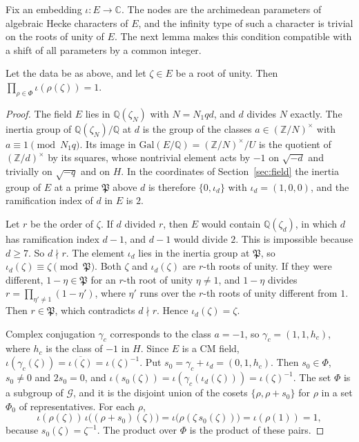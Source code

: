 Fix an embedding $\iota\colon E\to\mathbb C$. The nodes are the archimedean parameters of algebraic Hecke characters of $E$, and the infinity type of such a character is trivial on the roots of unity of $E$. The next lemma makes this condition compatible with a shift of all parameters by a common integer.

\begin{lemma}\label{r6:R6:lem:cmroot}
Let the data be as above, and let $\zeta\in E$ be a root of unity. Then $\prod_{\rho\in\Phi}\iota(\rho(\zeta))=1$.
\end{lemma}

\begin{proof}
The field $E$ lies in $\mathbb Q(\zeta_N)$ with $N=N_1qd$, and $d$ divides $N$ exactly. The inertia group of $\mathbb Q(\zeta_N)/\mathbb Q$ at $d$ is the group of the classes $a\in(\mathbb Z/N)^\times$ with $a\equiv1\pmod{N_1q}$. Its image in $\mathrm{Gal}(E/\mathbb Q)=(\mathbb Z/N)^\times/U$ is the quotient of $(\mathbb Z/d)^\times$ by its squares, whose nontrivial element acts by $-1$ on $\sqrt{-d}$ and trivially on $\sqrt{-q}$ and on $H$. In the coordinates of Section~\ref{sec:field} the inertia group of $E$ at a prime $\mathfrak P$ above $d$ is therefore $\{0,\iota_d\}$ with $\iota_d=(1,0,0)$, and the ramification index of $d$ in $E$ is $2$.

Let $r$ be the order of $\zeta$. If $d$ divided $r$, then $E$ would contain $\mathbb Q(\zeta_d)$, in which $d$ has ramification index $d-1$, and $d-1$ would divide $2$. This is impossible because $d\ge7$. So $d\nmid r$. The element $\iota_d$ lies in the inertia group at $\mathfrak P$, so $\iota_d(\zeta)\equiv\zeta\pmod{\mathfrak P}$. Both $\zeta$ and $\iota_d(\zeta)$ are $r$-th roots of unity. If they were different, $1-\eta\in\mathfrak P$ for an $r$-th root of unity $\eta\ne1$, and $1-\eta$ divides $r=\prod_{\eta'\ne1}(1-\eta')$, where $\eta'$ runs over the $r$-th roots of unity different from $1$. Then $r\in\mathfrak P$, which contradicts $d\nmid r$. Hence $\iota_d(\zeta)=\zeta$.

Complex conjugation $\gamma_c$ corresponds to the class $a=-1$, so $\gamma_c=(1,1,h_c)$, where $h_c$ is the class of $-1$ in $H$. Since $E$ is a CM field, $\iota(\gamma_c(\zeta))=\overline{\iota(\zeta)}=\iota(\zeta)^{-1}$. Put $s_0=\gamma_c+\iota_d=(0,1,h_c)$. Then $s_0\in\Phi$, $s_0\ne0$ and $2s_0=0$, and $\iota(s_0(\zeta))=\iota(\gamma_c(\iota_d(\zeta)))=\iota(\zeta)^{-1}$. The set $\Phi$ is a subgroup of $\mathcal G$, and it is the disjoint union of the cosets $\{\rho,\rho+s_0\}$ for $\rho$ in a set $\Phi_0$ of representatives. For each $\rho$,
\[
\iota(\rho(\zeta))\,\iota\big((\rho+s_0)(\zeta)\big)=\iota\big(\rho(\zeta\,s_0(\zeta))\big)=\iota(\rho(1))=1,
\]
because $s_0(\zeta)=\zeta^{-1}$. The product over $\Phi$ is the product of these pairs.
\end{proof}

